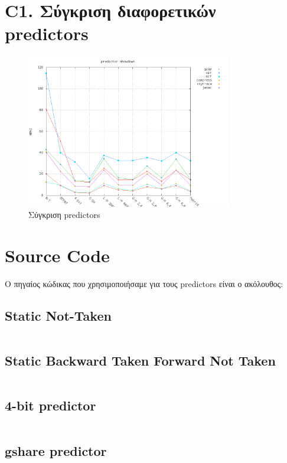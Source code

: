 \documentclass[a4paper,10pt]{article}
\begin{document}
\section*{C1. Σύγκριση διαφορετικών predictors}
\begin{figure}[H]
	\centering
	\includegraphics[width=0.8\textwidth]{../Results/part4/results_C1.png}
	\caption{Σύγκριση predictors}
\end{figure}


\section*{Source Code}
Ο πηγαίος κώδικας που χρησιμοποιήσαμε για τους predictors είναι ο ακόλουθος:

\subsection*{Static Not-Taken}
\inputminted[linenos,fontsize=\scriptsize,frame=leftline]{cpp}{files/ntaken.h}

\subsection*{Static Backward Taken Forward Not Taken}
\inputminted[linenos,fontsize=\scriptsize,frame=leftline]{cpp}{files/btfnt.h}

\subsection*{4-bit predictor}
\inputminted[linenos,fontsize=\scriptsize,frame=leftline]{cpp}{files/nbit_predictor.h}

\subsection*{gshare predictor}
\inputminted[linenos,fontsize=\scriptsize,frame=leftline]{cpp}{files/gshare_predictor.h}
\end{document}
